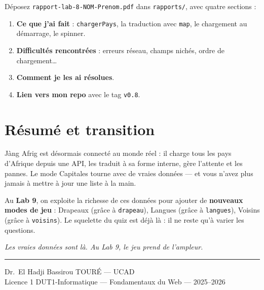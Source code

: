 \documentclass[11pt,a4paper]{article}
\newcommand{\code}[1]{\texttt{#1}}
\begin{document}
\begin{attentionbox}
Déposez \code{rapport-lab-8-NOM-Prenom.pdf} dans \code{rapports/}, avec quatre sections :
\begin{enumerate}[leftmargin=*,noitemsep]
  \item \textbf{Ce que j'ai fait} : \code{chargerPays}, la traduction avec \code{map}, le chargement au démarrage, le spinner.
  \item \textbf{Difficultés rencontrées} : erreurs réseau, champs nichés, ordre de chargement\ldots
  \item \textbf{Comment je les ai résolues}.
  \item \textbf{Lien vers mon repo} avec le tag \code{v0.8}.
\end{enumerate}
\end{attentionbox}

\section{Résumé et transition}

Jàng Afrig est désormais connecté au monde réel : il charge tous les pays d'Afrique depuis une API, les traduit à sa forme interne, gère l'attente et les pannes. Le mode Capitales tourne avec de vraies données --- et vous n'avez plus jamais à mettre à jour une liste à la main.

Au \textbf{Lab 9}, on exploite la richesse de ces données pour ajouter de \textbf{nouveaux modes de jeu} : Drapeaux (grâce à \code{drapeau}), Langues (grâce à \code{langues}), Voisins (grâce à \code{voisins}). Le squelette du quiz est déjà là : il ne reste qu'à varier les questions.

\begin{center}
\textit{Les vraies données sont là. Au Lab 9, le jeu prend de l'ampleur.}
\end{center}

\bigskip
\noindent\rule{\textwidth}{0.4pt}
\begin{center}
\small Dr.~El Hadji Bassirou TOURÉ --- UCAD\\
\small Licence 1 DUT1-Informatique --- Fondamentaux du Web --- 2025--2026
\end{center}
\end{document}
